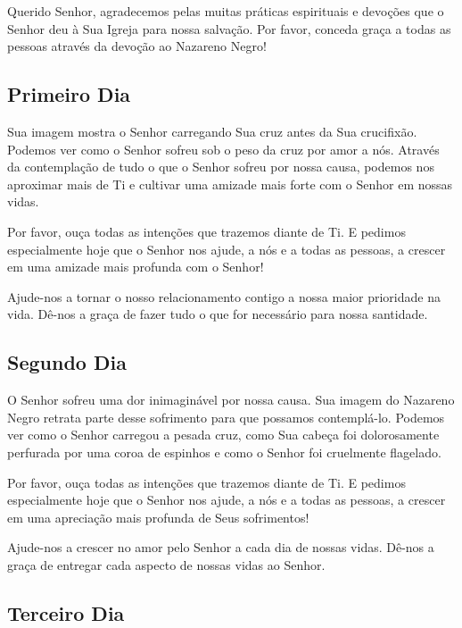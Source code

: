 \documentclass[18pt]{article}
\begin{document}
Querido Senhor, agradecemos pelas muitas práticas espirituais e devoções que o Senhor deu à Sua Igreja para nossa salvação. Por favor, conceda graça a todas as pessoas através da devoção ao Nazareno Negro!

\subsection{Primeiro Dia}
\textbf{}

Sua imagem mostra o Senhor carregando Sua cruz antes da Sua crucifixão. Podemos ver como o Senhor sofreu sob o peso da cruz por amor a nós. Através da contemplação de tudo o que o Senhor sofreu por nossa causa, podemos nos aproximar mais de Ti e cultivar uma amizade mais forte com o Senhor em nossas vidas.

Por favor, ouça todas as intenções que trazemos diante de Ti. E pedimos especialmente hoje que o Senhor nos ajude, a nós e a todas as pessoas, a crescer em uma amizade mais profunda com o Senhor!

Ajude-nos a tornar o nosso relacionamento contigo a nossa maior prioridade na vida. Dê-nos a graça de fazer tudo o que for necessário para nossa santidade.

\textbf{}

\subsection{Segundo Dia}
\textbf{}



O Senhor sofreu uma dor inimaginável por nossa causa. Sua imagem do Nazareno Negro retrata parte desse sofrimento para que possamos contemplá-lo. Podemos ver como o Senhor carregou a pesada cruz, como Sua cabeça foi dolorosamente perfurada por uma coroa de espinhos e como o Senhor foi cruelmente flagelado.

Por favor, ouça todas as intenções que trazemos diante de Ti. E pedimos especialmente hoje que o Senhor nos ajude, a nós e a todas as pessoas, a crescer em uma apreciação mais profunda de Seus sofrimentos!

Ajude-nos a crescer no amor pelo Senhor a cada dia de nossas vidas. Dê-nos a graça de entregar cada aspecto de nossas vidas ao Senhor.

\textbf{}


\subsection{Terceiro Dia}
\textbf{}
\end{document}
